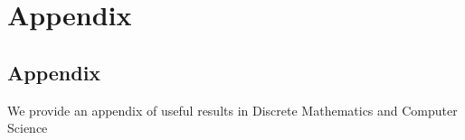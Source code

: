 \chapter{Appendix}

\section{Appendix}
We provide an appendix of useful results in Discrete Mathematics and Computer Science